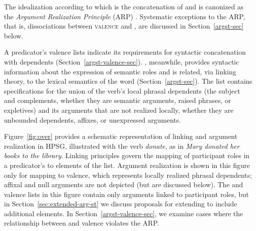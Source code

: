 \documentclass[output=paper,biblatex,babelshorthands,newtxmath,draftmode,colorlinks, citecolor=brown]{langscibook}
\begin{document}
\noindent
The idealization according to which \argst is the concatenation of \subj and \comps is canonized as
the \emph{Argument Realization Principle} (ARP)
\citep[494]{SWB2003a}.  Systematic exceptions to the ARP, that is, dissociations between
\textsc{valence} and \argst, are discussed in Section~\ref{argst-sec} below.

A predicator's valence lists indicate its requirements for syntactic concatenation with dependents (Section~\ref{argst-valence-sec}).  \argst, meanwhile, provides syntactic
information about the expression of semantic roles and is related, via linking theory, to the
lexical semantics of the word (Section~\ref{argst-sec}).  The \argst list contains specifications
for the union of the verb's local phrasal dependents (the subject and complements, whether they are
semantic arguments, raised phrases, or expletives) and its arguments that are not realized locally,
whether they are unbounded dependents, affixes, or unexpressed
arguments.

\largerpage[-1]
Figure~\ref{fig:over} provides a schematic representation of %
linking and argument realization in HPSG,  illustrated with the verb \textit{donate}, as in
\textit{Mary donated her books to the library}.   Linking principles govern the mapping of
participant roles in a predicator's \content to %
elements of the \argst list.   Argument realization
is shown in this figure only for mapping to valence, which represents locally realized phrasal
dependents; affixal and null arguments are not depicted (but are discussed below). 
The \argst and valence lists in this figure contain only arguments linked to participant
roles,  but in
Section~\ref{sec:extended-arg-st} we discuss proposals for extending \argst to include additional
elements. In Section~\ref{argst-valence-sec}, we examine cases where the relationship between \argst
and valence violates the ARP.
\end{document}
